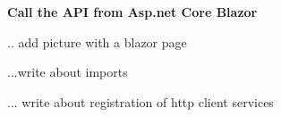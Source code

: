 \documentclass{scrartcl}
\begin{document}
\textbf{Call the API from Asp.net Core Blazor}

.. add picture with a blazor page

...write about imports 

... write about registration of http client services 

\noindent                                                                
\begin{minipage}{\linewidth}                           
\label{visina8                                                      }
\end{minipage}
\end{document}
